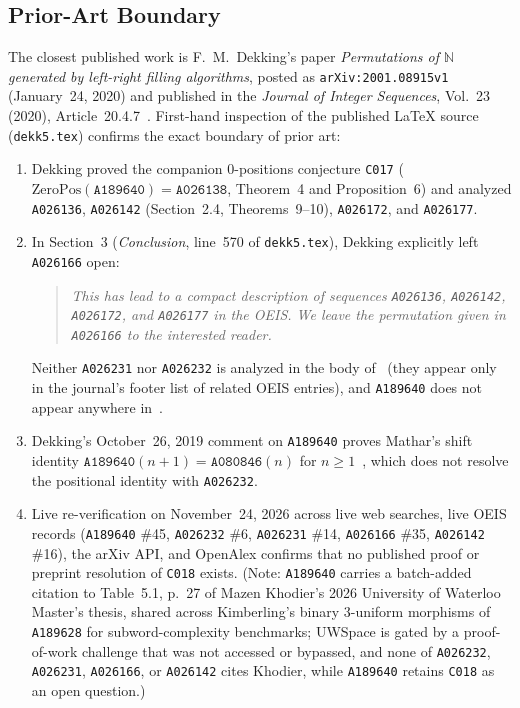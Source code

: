 \documentclass[11pt]{article}
\theoremstyle{definition}
\newcommand{\N}{\mathbb{N}}
\newcommand{\seq}[1]{\texttt{#1}}
\newcommand{\ZeroPos}{\mathrm{ZeroPos}}
\begin{document}
\subsection{Prior-Art Boundary}

The closest published work is F.~M.\ Dekking's paper \emph{Permutations of $\N$ generated by left-right filling algorithms}, posted as \texttt{arXiv:2001.08915v1} (January~24, 2020) and published in the \emph{Journal of Integer Sequences}, Vol.~23 (2020), Article~20.4.7~\cite{dekking2020}. First-hand inspection of the published \LaTeX{} source (\texttt{dekk5.tex}) confirms the exact boundary of prior art:
\begin{enumerate}
\item Dekking proved the companion $0$-positions conjecture \texttt{C017} ($\ZeroPos(\seq{A189640}) = \seq{A026138}$, Theorem~4 and Proposition~6) and analyzed \seq{A026136}, \seq{A026142} (Section~2.4, Theorems~9--10), \seq{A026172}, and \seq{A026177}.
\item In Section~3 (\emph{Conclusion}, line~570 of \texttt{dekk5.tex}), Dekking explicitly left \seq{A026166} open:
\begin{quote}\itshape
This has lead to a compact description of sequences \seq{A026136}, \seq{A026142}, \seq{A026172}, and \seq{A026177} in the OEIS. We leave the permutation given in \seq{A026166} to the interested reader.
\end{quote}
Neither \seq{A026231} nor \seq{A026232} is analyzed in the body of~\cite{dekking2020} (they appear only in the journal's footer list of related OEIS entries), and \seq{A189640} does not appear anywhere in~\cite{dekking2020}.
\item Dekking's October~26, 2019 comment on \seq{A189640} proves Mathar's shift identity $\seq{A189640}(n + 1) = \seq{A080846}(n)$ for $n \ge 1$~\cite{oeis080846}, which does not resolve the positional identity with \seq{A026232}.
\item Live re-verification on November~24, 2026 across live web searches, live OEIS records (\seq{A189640} \#45, \seq{A026232} \#6, \seq{A026231} \#14, \seq{A026166} \#35, \seq{A026142} \#16), the arXiv API, and OpenAlex confirms that no published proof or preprint resolution of \texttt{C018} exists. (Note: \seq{A189640} carries a batch-added citation to Table~5.1, p.~27 of Mazen Khodier's 2026 University of Waterloo Master's thesis, shared across Kimberling's binary $3$-uniform morphisms of \seq{A189628} for subword-complexity benchmarks; UWSpace is gated by a proof-of-work challenge that was not accessed or bypassed, and none of \seq{A026232}, \seq{A026231}, \seq{A026166}, or \seq{A026142} cites Khodier, while \seq{A189640} retains \texttt{C018} as an open question.)
\end{enumerate}
\end{document}
